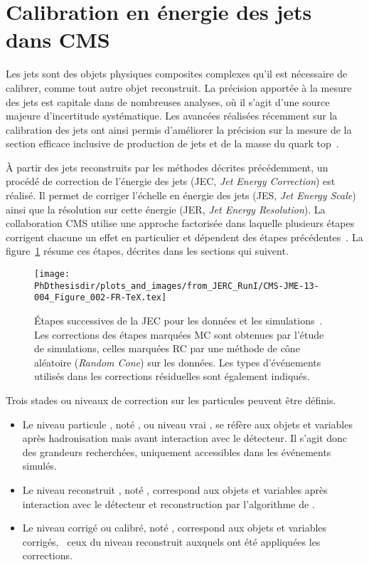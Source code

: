 \section{Calibration en énergie des jets dans CMS}\label{chapter-JERC-section-CMS}
Les jets sont des objets physiques composites complexes qu'il est nécessaire de calibrer, comme tout autre objet reconstruit.
La précision apportée à la mesure des jets est capitale dans de nombreuses analyses, où il s'agit d'une source majeure d'incertitude systématique.
Les avancées réalisées récemment sur la calibration des jets ont ainsi permis d'améliorer la précision sur la mesure de la section efficace inclusive de production de jets et de la masse du quark top~\cite{JERC_RunI}.
\par À partir des jets reconstruits par les méthodes décrites précédemment, un procédé de correction de l'énergie des jets (JEC, \emph{Jet Energy Correction}) est réalisé.
Il permet de corriger l'échelle en énergie des jets (JES, \emph{Jet Energy Scale}) ainsi que la résolution sur cette énergie (JER, \emph{Jet Energy Resolution}).
La collaboration CMS utilise une approche factorisée dans laquelle plusieurs étapes corrigent chacune un effet en particulier et dépendent des étapes précédentes~\cite{JERC_RunI}.
La figure~\ref{fig-CMS-JME-13-004_Figure_002-TeX} résume ces étapes, décrites dans les sections qui suivent.
\begin{figure}[h]
\centering
\texttt{[image: \\PhDthesisdir/plots\_and\_images/from\_JERC\_RunI/CMS-JME-13-004\_Figure\_002-FR-TeX.tex]}
\caption[Étapes successives de la JEC.]{Étapes successives de la JEC pour les données et les simulations~\cite{JERC_RunI}. Les corrections des étapes marquées \og MC \fg{} sont obtenues par l'étude de simulations, celles marquées \og RC \fg{} par une méthode de cône aléatoire (\emph{Random Cone}) sur les données. Les types d'événements utilisés dans les corrections résiduelles sont également indiqués.}
\label{fig-CMS-JME-13-004_Figure_002-TeX}
\end{figure}
\par Trois stades ou \og niveaux \fg{} de correction sur les particules peuvent être définis.
\begin{itemize}
\item Le niveau \og particule \fg, noté \ptcl, ou niveau \og vrai \fg{}, se réfère aux objets et variables après hadronisation mais avant interaction avec le détecteur. Il s'agit donc des grandeurs recherchées, uniquement accessibles dans les événements simulés.
\item Le niveau \og reconstruit \fg, noté \reco, correspond aux objets et variables après interaction avec le détecteur et reconstruction par l'algorithme de \PF.
\item Le niveau \og corrigé \fg{} ou calibré, noté \cali, correspond aux objets et variables corrigés, \ie\ ceux du niveau reconstruit auxquels ont été appliquées les corrections.
\end{itemize}
